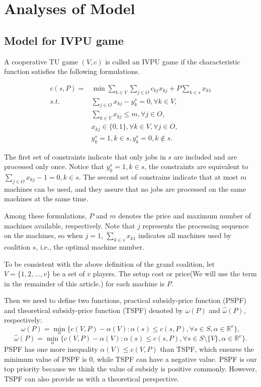 \section{Analyses of Model}

\subsection{Model for IVPU game}

A cooperative TU game $(V,c)$ is called an IVPU game if the characteristic function satisfies the following formulations.

\[
\begin{aligned}
c(s,P) = & {\min} \sum_{k\in V}\sum_{j\in O} {c_{kj} x_{kj}} + {P\sum_{k\in s} x_{k1}} \\
{s.t.}\quad & \sum_{j \in O} x_{kj}-y_k^s=0, \forall k \in V, \\
& \sum_{k\in V} x_{kj} \leq m,\forall j \in O,  \\
& x_{kj} \in \{0,1\} , \forall k \in V, \forall j \in O,\\
& y_k^s=1, k \in s, y_k^s=0, k \notin s.
\end{aligned}
\]

The first set of constraints indicate that only jobs in $s$ are included and are processed only once.
Notice that $ y_k^s=1, k \in s$, the constraints are equivalent to $\sum_{j \in O} x_{kj}-1=0, k \in s$.
The second set of constrains indicate that at most $m$
machines can be used, and they assure that no jobs are processed on the same machines at the same time.

Among these formulations, $P$ and $m$ denotes the price and maximum number of machines available, respectively. Note that $j$ represents the processing sequence on the machines, so when $j=1$, $\sum_{k\in s} x_{k1}$ indicates all machines used by coalition $s$, i.e., the optimal machine number.

To be consistent with the above definition of the grand coalition, let $V=\{1,2,\ldots,v\}$ be a set of $v$ players. The setup cost or price(We will use the term in the remainder of this article.) for each machine is $P$.


Then we need to define two functions, practical subsidy-price function (PSPF) and theoretical subsidy-price function (TSPF) denoted by $\omega(P)$ and $\hat{\omega}(P)$, respectively:
\[
  {\omega(P)}=\mathop{\min}_{\alpha}\{c(V,P)-\alpha(V): \alpha(s) \leq c(s,P)
 ,\forall s \in S, \alpha\in\mathbb{R}^{v}\},
\]
\[
  {\hat{\omega}(P)}=\mathop{\min}_{\alpha}\{c(V,P)-\alpha(V): \alpha(s) \leq c(s,P)
 ,\forall s \in S\setminus\{V\}, \alpha\in\mathbb{R}^{v}\}.
\]
PSPF has one more inequality $\alpha(V)\leq c(V,P)$ than TSPF, which ensures the minimum value of PSPF is 0, while TSPF can have a negative value. PSPF is our top priority because we think the value of subsidy is positive commonly. However, TSPF can also provide us with a theoretical perspective.

